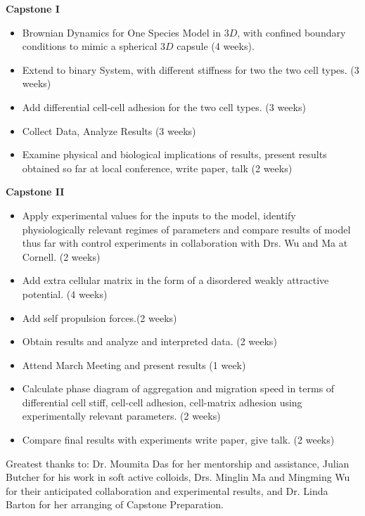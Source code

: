 \documentclass[aps,prb,twocolumn,groupedaddress,nofootinbib,floatfix]{revtex4}
\begin{document}
{\bf Capstone I}
\begin{itemize}\itemsep1pt \parskip0pt 
\item Brownian Dynamics for One Species Model in $3D$, with confined boundary conditions to mimic a spherical $3D$ capsule (4 weeks).
\item Extend to binary System, with different stiffness for two the two cell types. (3 weeks)
\item Add differential cell-cell adhesion for the two cell types. (3 weeks) 
\item Collect Data, Analyze Results (3 weeks)
\item Examine physical and biological implications of results, present results obtained so far 
at local conference, write paper, talk (2 weeks)
\end{itemize}
{\bf Capstone II} 
\begin{itemize}\itemsep1pt \parskip0pt
\item Apply experimental values for the inputs to the model, identify physiologically relevant regimes of parameters
and compare results of model thus far with control experiments in collaboration with Drs. Wu and Ma at Cornell. (2 weeks) 
\item Add extra cellular matrix in the form of a disordered weakly attractive potential. (4 weeks) 
\item Add self propulsion forces.(2 weeks)
\item Obtain results and analyze and interpreted  data. (2 weeks)
\item Attend March Meeting and present results (1 week)
\item Calculate phase diagram of aggregation and migration speed in terms of differential 
cell stiff, cell-cell adhesion, cell-matrix adhesion using experimentally relevant parameters. (2 weeks)
 \item Compare final results with experiments  write paper, give talk. (2 weeks)
\end{itemize}

\begin{acknowledgments}
Greatest thanks to: Dr. Moumita Das for her mentorship and assistance, Julian Butcher for his work in soft active colloids, Drs. Minglin Ma and Mingming Wu for their anticipated collaboration and experimental results, and Dr. Linda Barton for her arranging of Capstone Preparation.
\end{acknowledgments}

%
%



\end{document}
